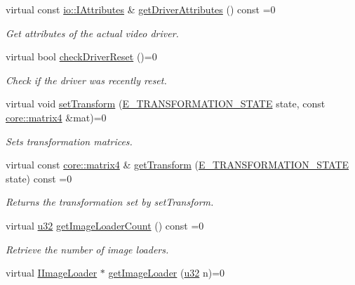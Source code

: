 \begin{DoxyCompactItemize}
virtual const \hyperlink{classirr_1_1io_1_1IAttributes}{io\+::\+I\+Attributes} \& \hyperlink{classirr_1_1video_1_1IVideoDriver_a2b43d2215f2e5aad9b4f92aa635bcc85}{get\+Driver\+Attributes} () const =0
\begin{DoxyCompactList}\small\item\em Get attributes of the actual video driver. \end{DoxyCompactList}\item 
virtual bool \hyperlink{classirr_1_1video_1_1IVideoDriver_a4ba84ee992939fc913d4935caffce87b}{check\+Driver\+Reset} ()=0
\begin{DoxyCompactList}\small\item\em Check if the driver was recently reset. \end{DoxyCompactList}\item 
virtual void \hyperlink{classirr_1_1video_1_1IVideoDriver_aaf6e88bedf7b91666a2bd34f46e092fc}{set\+Transform} (\hyperlink{namespaceirr_1_1video_a15b57657a320243be03ae6f66fcff43d}{E\+\_\+\+T\+R\+A\+N\+S\+F\+O\+R\+M\+A\+T\+I\+O\+N\+\_\+\+S\+T\+A\+TE} state, const \hyperlink{namespaceirr_1_1core_a4c9d4e29899535971052810954a14431}{core\+::matrix4} \&mat)=0
\begin{DoxyCompactList}\small\item\em Sets transformation matrices. \end{DoxyCompactList}\item 
virtual const \hyperlink{namespaceirr_1_1core_a4c9d4e29899535971052810954a14431}{core\+::matrix4} \& \hyperlink{classirr_1_1video_1_1IVideoDriver_a85c7d04aee02c2d5d8102279f9233101}{get\+Transform} (\hyperlink{namespaceirr_1_1video_a15b57657a320243be03ae6f66fcff43d}{E\+\_\+\+T\+R\+A\+N\+S\+F\+O\+R\+M\+A\+T\+I\+O\+N\+\_\+\+S\+T\+A\+TE} state) const =0
\begin{DoxyCompactList}\small\item\em Returns the transformation set by set\+Transform. \end{DoxyCompactList}\item 
virtual \hyperlink{namespaceirr_a0416a53257075833e7002efd0a18e804}{u32} \hyperlink{classirr_1_1video_1_1IVideoDriver_a92535921ad01c90570533ba60b0b76b2}{get\+Image\+Loader\+Count} () const =0
\begin{DoxyCompactList}\small\item\em Retrieve the number of image loaders. \end{DoxyCompactList}\item 
virtual \hyperlink{classirr_1_1video_1_1IImageLoader}{I\+Image\+Loader} $\ast$ \hyperlink{classirr_1_1video_1_1IVideoDriver_a5cc08e7cd2ce2a30275e22ce13bb1013}{get\+Image\+Loader} (\hyperlink{namespaceirr_a0416a53257075833e7002efd0a18e804}{u32} n)=0

\end{DoxyCompactItemize}
